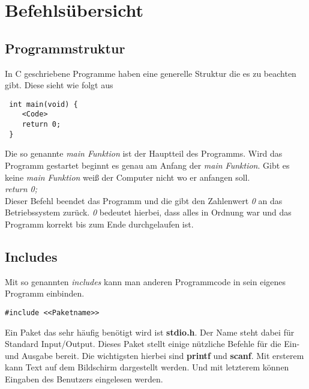 \documentclass[c_worksheet.tex]{subfiles}
\begin{document}
	
\chapter{Befehlsübersicht} 

\section{Programmstruktur}

In C geschriebene Programme haben eine generelle Struktur die es zu beachten gibt. Diese sieht wie folgt aus

\begin{lstlisting}
 int main(void) {
    <Code>
    return 0;
 }
 \end{lstlisting} 

Die so genannte \emph{main Funktion} ist der Hauptteil des Programms. Wird das Programm gestartet beginnt es genau am Anfang der \emph{main Funktion}. Gibt es keine \emph{main Funktion} weiß der Computer nicht wo er anfangen soll. \\

\textit{return 0;} \\

Dieser Befehl beendet das Programm und die gibt den Zahlenwert \emph{0} an das Betriebssystem zurück. \emph{0} bedeutet hierbei, dass alles in Ordnung war und das Programm korrekt bis zum Ende durchgelaufen ist.



\section{Includes} 

Mit so genannten \emph{includes} kann man anderen Programmcode in sein eigenes Programm einbinden.

\begin{lstlisting}[numbers=none]
#include <<Paketname>>
\end{lstlisting}

Ein Paket das sehr häufig benötigt wird ist \textbf{stdio.h}. Der Name steht dabei für Standard Input/Output. Dieses Paket stellt einige nützliche Befehle für die Ein- und Ausgabe bereit.
Die wichtigsten hierbei sind \textbf{printf} und \textbf{scanf}. Mit ersterem kann Text auf dem Bildschirm dargestellt werden. Und mit letzterem können Eingaben des Benutzers eingelesen werden.

 
\end{document}
